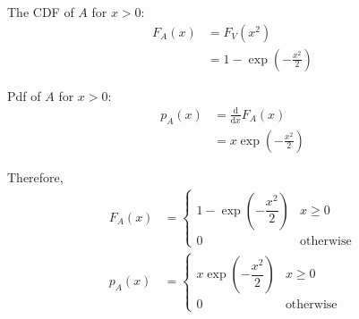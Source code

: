 \documentclass[journal,12pt,twocolumn]{IEEEtran}
\providecommand{\brak}[1]{\ensuremath{\left(#1\right)}}
\providecommand{\der}[1]{\mathrm{d} #1}
\numberwithin{equation}{section}
\renewcommand\thesection{\arabic{section}}
\begin{document}
\begin{enumerate}[label=\thesection.\arabic*,ref=\thesection.\theenumi]
	The CDF of $A$ for $x > 0$:
	\begin{align}
		F_A(x) &=  F_V(x^2) \\
		&= 1 - \exp\brak{-\frac{x^2}{2}}
	\end{align}
	
	Pdf of $A$ for $x > 0$:
	\begin{align}
		p_A(x) &= \frac{\der{}}{\der{x}} F_A(x) \\
		&= x \exp\brak{-\frac{x^2}{2}}
	\end{align}
	
	Therefore,
	\begin{align}
		F_A(x) &= 
		\begin{cases}
			1 - \exp\brak{-\dfrac{x^2}{2}} & x \geq 0 \\
			0 & \text{otherwise}
		\end{cases}	\\
		p_A(x) &= 
		\begin{cases}
			x \exp\brak{-\dfrac{x^2}{2}} & x \geq 0 \\
			0 & \text{otherwise}
		\end{cases}
	\end{align}
	
	\end{enumerate}
\end{document}
